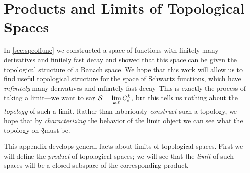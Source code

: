 
  \chapter{Products and Limits of Topological Spaces}
    \label{ch:topprod}

    In \autoref{sec:spcoffunc} we constructed a space of functions with finitely many derivatives and finitely fast decay and showed that this space can be given the topological structure of a Banach space.
    We hope that this work will allow us to find useful topological structure for the space of Schwartz functions, which have \emph{infinitely} many derivatives and infinitely fast decay.
    This is exactly the process of taking a limit---we want to say $\S=\lim\limits_{k,\ell}C^k_\ell$, but this tells us nothing about the \emph{topology} of such a limit.
    Rather than laboriously \emph{construct} such a topology, we hope that by \emph{characterizing} the behavior of the limit object we can see what the topology on \S must be.

    This appendix develops general facts about limits of topological spaces.
    First we will define the \emph{product} of topological spaces; we will see that the \emph{limit} of such spaces will be a closed subspace of the corresponding product.

